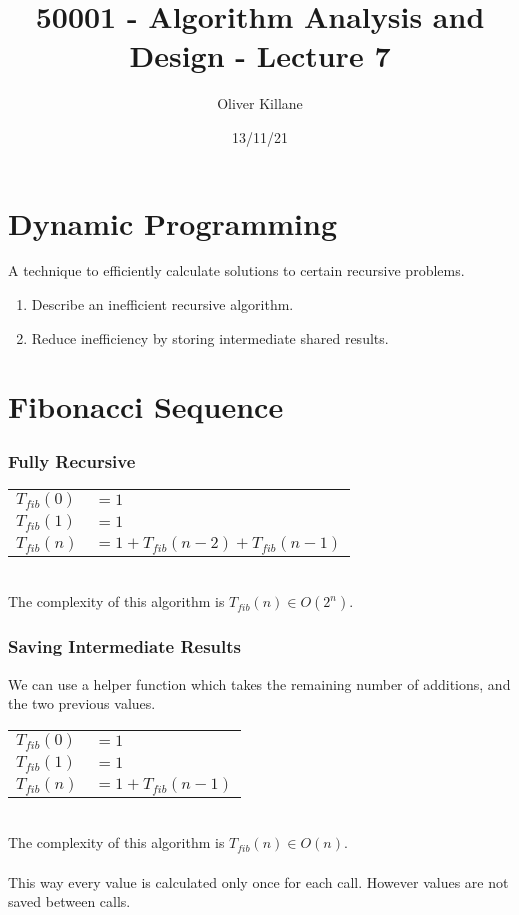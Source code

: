 \documentclass{report}
\title{50001 - Algorithm Analysis and Design - Lecture 7}
\author{Oliver Killane}
\date{13/11/21}
\begin{document}
\maketitle
{}

\section*{Dynamic Programming}
A technique to efficiently calculate solutions to certain recursive problems.
\begin{enumerate}
	\item Describe an inefficient recursive algorithm.
	\item Reduce inefficiency by storing intermediate shared results.
\end{enumerate}

\section*{Fibonacci Sequence}
\subsubsection*{Fully Recursive}
\begin{tabular}{l l}
	$T_{fib}(0)$ & $= 1$                               \\
	$T_{fib}(1)$ & $= 1$                               \\
	$T_{fib}(n)$ & $= 1 + T_{fib}(n-2) + T_{fib}(n-1)$ \\
\end{tabular}
\\ The complexity of this algorithm is $T_{fib}(n) \in O(2^n)$.
\subsubsection*{Saving Intermediate Results}
We can use a helper function which takes the remaining number of additions, and the two previous values.
\begin{tabular}{l l}
	$T_{fib}(0)$ & $= 1$                \\
	$T_{fib}(1)$ & $= 1$                \\
	$T_{fib}(n)$ & $= 1 + T_{fib}(n-1)$ \\
\end{tabular}
\\The complexity of this algorithm is $T_{fib}(n) \in O(n)$.
\\
\\ This way every value is calculated only once for each call. However values are not saved between calls.
\end{document}
